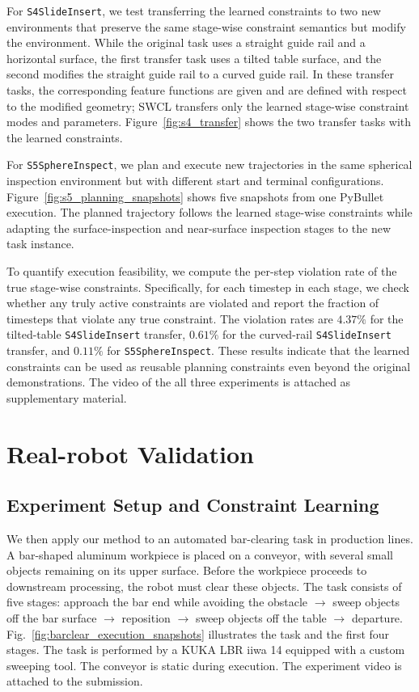 \documentclass[lettersize,journal]{IEEEtran}
\begin{document}
For \texttt{S4SlideInsert}, we test transferring the learned constraints to two new environments that preserve the same stage-wise constraint semantics but modify the environment. While the original task uses a straight guide rail and a horizontal surface, the first transfer task uses a tilted table surface, and the second modifies the straight guide rail to a curved guide rail. In these transfer tasks, the corresponding feature functions are given and are defined with respect to the modified geometry; SWCL transfers only the learned stage-wise constraint modes and parameters. Figure~\ref{fig:s4_transfer} shows the two transfer tasks with the learned constraints.

For \texttt{S5SphereInspect}, we plan and execute new trajectories in the same spherical inspection environment but with different start and terminal configurations. Figure~\ref{fig:s5_planning_snapshots} shows five snapshots from one PyBullet execution. The planned trajectory follows the learned stage-wise constraints while adapting the surface-inspection and near-surface inspection stages to the new task instance.

To quantify execution feasibility, we compute the per-step violation rate of the true stage-wise constraints. Specifically, for each timestep in each stage, we check whether any truly active constraints are violated and report the fraction of  timesteps that violate any true constraint. The violation rates are $4.37\%$ for the tilted-table \texttt{S4SlideInsert} transfer, $0.61\%$ for the curved-rail \texttt{S4SlideInsert} transfer, and $0.11\%$ for \texttt{S5SphereInspect}. These results indicate that the learned constraints can be used as reusable planning constraints even beyond the original demonstrations. The video of the all three experiments is attached as supplementary material.

\section{Real-robot Validation}
\subsection{Experiment Setup and Constraint Learning}
We then apply our method to an automated bar-clearing task in production lines. A bar-shaped aluminum workpiece is placed on a conveyor, with several small objects remaining on its upper surface. Before the workpiece proceeds to downstream processing, the robot must clear these objects. The task consists of five stages: approach the bar end while avoiding the obstacle $\rightarrow$  sweep objects off the bar surface $\rightarrow$ reposition $\rightarrow$ sweep objects off the table $\rightarrow$ departure. Fig.~\ref{fig:barclear_execution_snapshots} illustrates the task and the first four stages. The task is performed by a KUKA LBR iiwa 14 equipped with a custom sweeping tool. The conveyor is static during execution. The experiment video is attached to the submission. 
\end{document}
